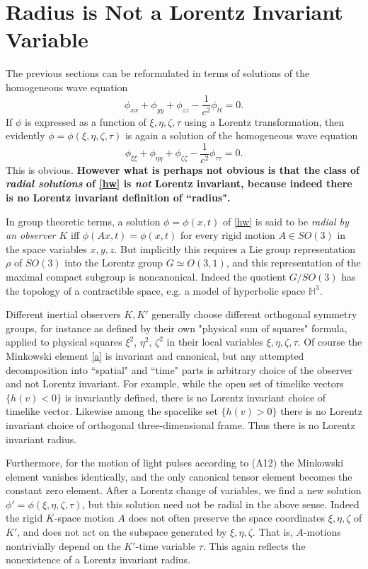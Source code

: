 \documentclass[12pt]{amsart}
\theoremstyle{definition}
\theoremstyle{remark}
\newcommand{\bH}{\mathbb{H}}
\begin{document}
\section{Radius is Not a Lorentz Invariant Variable}
The previous sections can be reformulated in terms of solutions of the homogeneous wave equation 
\begin{equation} \label{hw}
\phi_{xx}+\phi_{yy}+\phi_{zz}-\frac{1}{c^2}\phi_{tt}=0.
\end{equation} 
If $\phi$ is expressed as a function of $\xi, \eta, \zeta, \tau$ using a Lorentz transformation, then evidently $\phi=\phi(\xi, \eta, \zeta, \tau)$ is again a solution of the homogeneous wave equation $$\phi_{\xi \xi}+\phi_{\eta \eta}+\phi_{\zeta \zeta}-\frac{1}{c^2}\phi_{\tau \tau}=0.$$ This is obvious. \textbf{However what is perhaps not obvious is that the class of \emph{radial solutions} of \eqref{hw} is \emph{not} Lorentz invariant, because indeed there is no Lorentz invariant definition of ``radius".} 

In group theoretic terms, a solution $\phi=\phi(x,t)$ of \eqref{hw} is said to be \emph{radial by an observer $K$} iff $\phi(Ax,t)=\phi(x,t)$ for every rigid motion $A\in SO(3)$ in the space variables $x,y,z$. But implicitly this requires a Lie group representation $\rho$ of $SO(3)$ into the Lorentz group $G\simeq O(3,1)$, and this representation of the maximal compact subgroup is noncanonical. Indeed the quotient $G/SO(3)$ has the topology of a contractible space, e.g. a model of hyperbolic space $\bH^3$. 

Different inertial observers $K, K'$ generally choose different orthogonal symmetry groups, for instance as defined by their own "physical sum of squares" formula, applied to physical squares $\xi^2$, $\eta^2$, $\zeta^2$ in their local variables $\xi, \eta, \zeta, \tau$. Of course the Minkowski element \eqref{a} is invariant and canonical, but any attempted decomposition into ``spatial" and ``time" parts is arbitrary choice of the observer and not Lorentz invariant. For example, while the open set of timelike vectors $\{h(v)<0\}$ is invariantly defined, there is no Lorentz invariant choice of timelike vector. Likewise among the spacelike set $\{h(v)>0\}$ there is no Lorentz invariant choice of orthogonal three-dimensional frame. Thus there is no Lorentz invariant radius.

Furthermore, for the motion of light pulses according to (A12) the Minkowski element vanishes identically, and the only canonical tensor element becomes the constant zero element. After a Lorentz change of variables, we find a new solution $\phi'=\phi(\xi, \eta, \zeta, \tau)$, but this solution need not be radial in the above sense. Indeed the rigid $K$-space motion $A$ does not often preserve the space coordinates $\xi, \eta, \zeta$ of $K'$, and does not act on the subspace generated by $\xi, \eta, \zeta$. That is, $A$-motions nontrivially depend on the $K'$-time variable $\tau$.
This again reflects the nonexistence of a Lorentz invariant radius.
\end{document}
